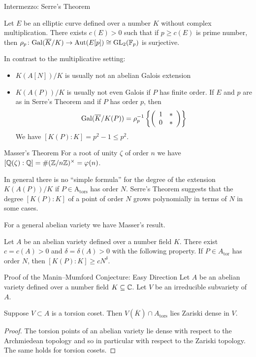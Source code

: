 \documentclass{beamer}
\begin{document}
\begin{frame}{Intermezzo: Serre's Theorem}
  \begin{theorem}[Serre]
    Let $E$ be  an elliptic curve defined over a number $K$
    \alert{without} complex multiplication.
    There exists $c(E)>0$ such that
    if $p\ge c(E)$ is prime number, then $\rho_p \colon
    \mathrm{Gal}(\overline{K}/K)\rightarrow \mathrm{Aut}(E[p]) \cong \mathrm{GL}_2({\mathbb{F}}_p)$
    is surjective.  
  \end{theorem}

  In contrast to the multiplicative setting:
  \begin{itemize}
  \item 
    $K(A[N])/K$ is usually \alert{not} an  \alert{abelian} Galois extension
  \item 
     $K(A(P))/K$ is usually  \alert{not}  even Galois if $P$ has finite
     order. If  $E$
     and $p$ are as in Serre's Theorem and if $P$ has order $p$, then
     \begin{equation*}
       \mathrm{Gal}(\overline K/K(P))=       \rho_p^{-1} \left\{\left( \begin{array}{cc} {1} & {*} \\ {0} & {*} \end{array} \right)\right\}
     \end{equation*}
     We have $[K(P):K] = p^2-1 \le p^2$. 
   \end{itemize}   
\end{frame}

\begin{frame}{Masser's Theorem}
  For a root of unity $\zeta$ of order $n$ we have $[{\mathbb{Q}}(\zeta):{\mathbb{Q}}] =
  \#({\mathbb{Z}}/n{\mathbb{Z}})^\times =\varphi(n)$.
  
  In general there is no ``simple formula'' for the degree of the
  extension $K(A(P))/K$ if $P\in \mathrm{A}_{\mathrm{tors}}$ has order
  $N$.
  Serre's Theorem
  suggests that the degree $[K(P):K]$ of a point of order $N$ grows
  polynomially in terms of $N$ in some cases.

  For a general abelian variety we have Masser's result. 
  
  \begin{theorem}[Masser]
    Let $A$ be an abelian variety defined over a number field $K$. There
    exist $c=c(A)>0$ and $\delta=\delta(A)>0$ with the following
    property. If $P \in A_{\mathrm{tor}}$ has order $N$, then
    $[K(P):K]\ge c N^{\delta}$. 
  \end{theorem}
\end{frame}

\begin{frame}{Proof of the Manin--Mumford Conjecture: Easy Direction}
  Let $A$ be an abelian variety defined over a number field
  $K\subseteq{\mathbb{C}}$.
  Let $V$ be an irreducible subvariety of $A$.

  
  \begin{lemma}
    Suppose $V\subset A$ is a torsion coset. Then $V(\overline K)\cap
    A_{\mathrm{tors}}$ lies Zariski dense in $V$. 
  \end{lemma}
  \begin{proof}
    The torsion points of an abelian variety lie dense with respect to
    the Archmiedean topology and so in particular with respect to the
    Zariski topology. The same holds for torsion cosets. 
  \end{proof}
\end{frame}
\end{document}
